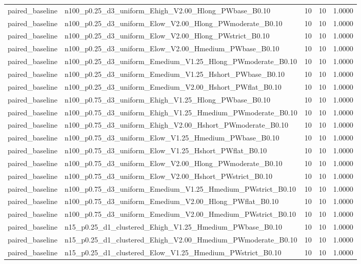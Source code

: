 \begin{tabular}{llrrr}
paired_baseline & n100_p0.25_d3_uniform_Ehigh_V2.00_Hlong_PWbase_B0.10 & 10 & 10 & 1.0000 \\
paired_baseline & n100_p0.25_d3_uniform_Elow_V2.00_Hlong_PWmoderate_B0.10 & 10 & 10 & 1.0000 \\
paired_baseline & n100_p0.25_d3_uniform_Elow_V2.00_Hlong_PWstrict_B0.10 & 10 & 10 & 1.0000 \\
paired_baseline & n100_p0.25_d3_uniform_Elow_V2.00_Hmedium_PWbase_B0.10 & 10 & 10 & 1.0000 \\
paired_baseline & n100_p0.25_d3_uniform_Emedium_V1.25_Hlong_PWmoderate_B0.10 & 10 & 10 & 1.0000 \\
paired_baseline & n100_p0.25_d3_uniform_Emedium_V1.25_Hshort_PWbase_B0.10 & 10 & 10 & 1.0000 \\
paired_baseline & n100_p0.25_d3_uniform_Emedium_V2.00_Hshort_PWflat_B0.10 & 10 & 10 & 1.0000 \\
paired_baseline & n100_p0.75_d3_uniform_Ehigh_V1.25_Hlong_PWbase_B0.10 & 10 & 10 & 1.0000 \\
paired_baseline & n100_p0.75_d3_uniform_Ehigh_V1.25_Hmedium_PWmoderate_B0.10 & 10 & 10 & 1.0000 \\
paired_baseline & n100_p0.75_d3_uniform_Ehigh_V2.00_Hshort_PWmoderate_B0.10 & 10 & 10 & 1.0000 \\
paired_baseline & n100_p0.75_d3_uniform_Elow_V1.25_Hmedium_PWbase_B0.10 & 10 & 10 & 1.0000 \\
paired_baseline & n100_p0.75_d3_uniform_Elow_V1.25_Hshort_PWflat_B0.10 & 10 & 10 & 1.0000 \\
paired_baseline & n100_p0.75_d3_uniform_Elow_V2.00_Hlong_PWmoderate_B0.10 & 10 & 10 & 1.0000 \\
paired_baseline & n100_p0.75_d3_uniform_Elow_V2.00_Hshort_PWstrict_B0.10 & 10 & 10 & 1.0000 \\
paired_baseline & n100_p0.75_d3_uniform_Emedium_V1.25_Hmedium_PWstrict_B0.10 & 10 & 10 & 1.0000 \\
paired_baseline & n100_p0.75_d3_uniform_Emedium_V2.00_Hlong_PWflat_B0.10 & 10 & 10 & 1.0000 \\
paired_baseline & n100_p0.75_d3_uniform_Emedium_V2.00_Hmedium_PWstrict_B0.10 & 10 & 10 & 1.0000 \\
paired_baseline & n15_p0.25_d1_clustered_Ehigh_V1.25_Hmedium_PWbase_B0.10 & 10 & 10 & 1.0000 \\
paired_baseline & n15_p0.25_d1_clustered_Ehigh_V2.00_Hmedium_PWmoderate_B0.10 & 10 & 10 & 1.0000 \\
paired_baseline & n15_p0.25_d1_clustered_Elow_V1.25_Hmedium_PWstrict_B0.10 & 10 & 10 & 1.0000 \\

\end{tabular}
